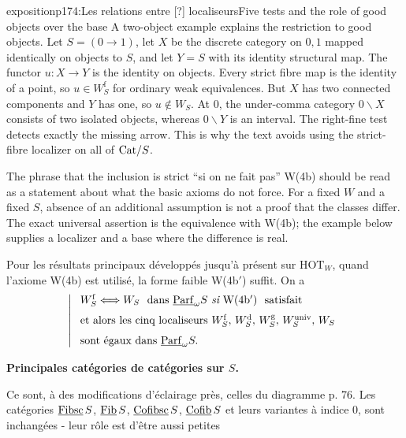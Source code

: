 \begin{dcomment}{exposition}{p174:Les relations entre [?] localiseurs}{Five tests and the role of good objects over the base}
A two-object example explains the restriction to good objects. Let $S=(0\to1)$, let $X$ be the discrete category on $0,1$ mapped identically on objects to $S$, and let $Y=S$ with its identity structural map. The functor $u:X\to Y$ is the identity on objects. Every strict fibre map is the identity of a point, so $u\in W_S^{\mathrm f}$ for ordinary weak equivalences. But $X$ has two connected components and $Y$ has one, so $u\notin W_S$. At $0$, the under-comma category $0\backslash X$ consists of two isolated objects, whereas $0\backslash Y$ is an interval. The right-fine test detects exactly the missing arrow. This is why the text avoids using the strict-fibre localizer on all of $\mathrm{Cat}/S$.

The phrase that the inclusion is strict ``si on ne fait pas'' W(4b) should be read as a statement about what the basic axioms do not force. For a fixed $W$ and a fixed $S$, absence of an additional assumption is not a proof that the classes differ. The exact universal assertion is the equivalence with W(4b); the example below supplies a localizer and a base where the difference is real.
\end{dcomment}


Pour les résultats principaux développés jusqu'à présent sur $\mathrm{HOT}_W$, quand l'axiome W(4b) est utilisé, la forme faible W(4b$'$) suffit. On a
\[
\left|\;
\begin{array}{l}
W_S^{\mathrm{f}} \Longleftrightarrow W_S \ \text{ dans } \ul{Parf}_\omega S \ \textit{si}\ \mathrm{W}(4\mathrm{b}')\ \ \text{satisfait}\\[1.5ex]
\text{et alors les cinq localiseurs } W_S^{\mathrm{f}},\, W_S^{\mathrm{d}},\, W_S^{\mathrm{g}},\, W_S^{\mathrm{univ}},\, W_S\\[1.5ex]
\text{sont égaux dans } \ul{Parf}_\omega S.
\end{array}
\right.
\]

 \textbf{Principales catégories de catégories sur $S$.}

Ce sont, à des modifications d'éclairage près, celles du diagramme p. 76. Les catégories $\underline{\mathrm{Fibsc}}\,S$, $\underline{\mathrm{Fib}}\,S$, $\underline{\mathrm{Cofibsc}}\,S$, $\underline{\mathrm{Cofib}}\,S$ et leurs variantes à indice 0, sont inchangées - leur rôle est d'être aussi petites


